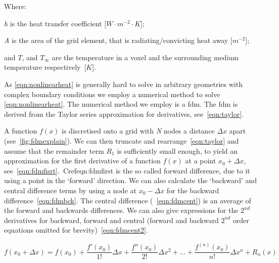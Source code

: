 \noindent Where:

	\indent \textit{h} is the heat transfer coefficient [$W\cdot m^{-2}\cdot K$];
	
	\indent \textit{A} is the area of the grid element, that is radiating/convicting heat away [$m^{-2}$];
	
	\indent and $T$, and $T_\infty$ are the temperature in a voxel and the surrounding medium temperature respectively~[$K$].
	
	\medskip

As \cref{eqn:nonlinearheat} is generally hard to solve in arbitrary geometries with complex boundary conditions we employ a numerical method to solve \cref{eqn:nonlinearheat}.
The numerical method we employ is a \gls{fdm}. The \gls{fdm} is derived from the Taylor series approximation for derivatives, see~\cref{eqn:taylor}. 


A function $f(x)$ is discretised onto a grid with \textit{N} nodes a distance $\Delta x$ apart (see~\cref{fig:fdmexplain}). We can then truncate and rearrange~\cref{eqn:taylor} and assume that the remainder term $R_1$ is sufficiently small enough, to yield an approximation for the first derivative of a function $f(x)$ at a point $x_0+\Delta x$, see~\cref{eqn:fdmfisrt}.~Cref{eqn:fdmfirst} is the so called forward difference, due to it using a point in the `forward' direction. We can also calculate the `backward' and central difference terms by using a node at $x_0-\Delta x$ for the backward difference~\cref{eqn:fdmbck}. The central difference (~\cref{eqn:fdmcent}) is an average of the forward and backwards differences. We can also give expressions for the $2^{nd}$ derivatives for backward, forward and central (forward and backward $2^{nd}$ order equations omitted for brevity)~\cref{eqn:fdmcent2}.


\begin{equation}
f(x_0+\Delta x)=f(x_0) + \frac{f'(x_0)}{1!}\Delta x + \frac{f''(x_0)}{2!}\Delta x^2+...+ \frac{f^{(n)}(x_0)}{n!}\Delta x^n+R_n(x)
\label{eqn:taylor}
\end{equation}

